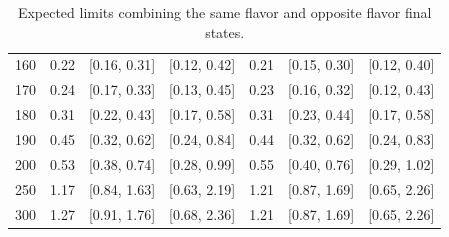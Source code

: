 \begin{table}[!ht]
\begin{center}
\begin{tabular} {|c|ccc||ccc|}
160 & 0.22 & [0.16, 0.31] & [0.12, 0.42]  & 0.21 & [0.15, 0.30] & [0.12, 0.40] \\
170 & 0.24 & [0.17, 0.33] & [0.13, 0.45]  & 0.23 & [0.16, 0.32] & [0.12, 0.43] \\
180 & 0.31 & [0.22, 0.43] & [0.17, 0.58]  & 0.31 & [0.23, 0.44] & [0.17, 0.58] \\
190 & 0.45 & [0.32, 0.62] & [0.24, 0.84]  & 0.44 & [0.32, 0.62] & [0.24, 0.83] \\
200 & 0.53 & [0.38, 0.74] & [0.28, 0.99]  & 0.55 & [0.40, 0.76] & [0.29, 1.02] \\
250 & 1.17 & [0.84, 1.63] & [0.63, 2.19]  & 1.21 & [0.87, 1.69] & [0.65, 2.26] \\
300 & 1.27 & [0.91, 1.76] & [0.68, 2.36]  & 1.21 & [0.87, 1.69] & [0.65, 2.26] \\
\hline
\end{tabular}
\caption{Expected limits combining the same flavor and opposite flavor final states.}
\label{tab:sfof_limits}
\end{center}
\end{table}
